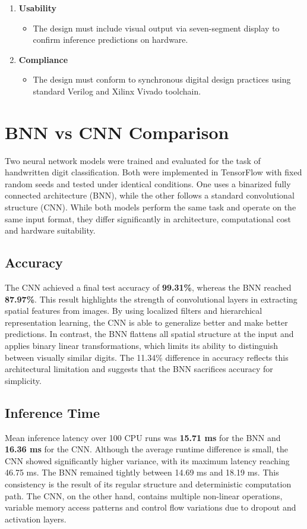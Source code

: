 \documentclass[a4paper,12pt]{report}
\begin{document}
\begin{enumerate}[label=(\roman*)]
    \item \textbf{Usability}
    \begin{itemize}
        \item The design must include visual output via seven-segment display to confirm inference predictions on hardware.
    \end{itemize}

    \item \textbf{Compliance}
    \begin{itemize}
        \item The design must conform to synchronous digital design practices using standard Verilog and Xilinx Vivado toolchain.
    \end{itemize}
\end{enumerate}

\clearpage
\section{BNN vs CNN Comparison}
Two neural network models were trained and evaluated for the task of handwritten digit classification. Both were implemented in TensorFlow with fixed random seeds and tested under identical conditions. One uses a binarized fully connected architecture (BNN), while the other follows a standard convolutional structure (CNN). While both models perform the same task and operate on the same input format, they differ significantly in architecture, computational cost and hardware suitability.

\subsection{Accuracy}
The CNN achieved a final test accuracy of \textbf{99.31\%}, whereas the BNN reached \textbf{87.97\%}. This result highlights the strength of convolutional layers in extracting spatial features from images. By using localized filters and hierarchical representation learning, the CNN is able to generalize better and make better predictions. In contrast, the BNN flattens all spatial structure at the input and applies binary linear transformations, which limits its ability to distinguish between visually similar digits. The 11.34\% difference in accuracy reflects this architectural limitation and suggests that the BNN sacrifices accuracy for simplicity.

\subsection{Inference Time}
Mean inference latency over 100 CPU runs was \textbf{15.71 ms} for the BNN and \textbf{16.36 ms} for the CNN. Although the average runtime difference is small, the CNN showed significantly higher variance, with its maximum latency reaching 46.75 ms. The BNN remained tightly between 14.69 ms and 18.19 ms. This consistency is the result of its regular structure and deterministic computation path. The CNN, on the other hand, contains multiple non-linear operations, variable memory access patterns and control flow variations due to dropout and activation layers.
\end{document}
